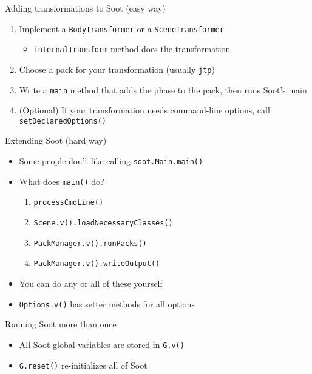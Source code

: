 \begin{slide}{Adding transformations to Soot (easy way)}
\vspace*{-0.1in}
\begin{enumerate}
\item Implement a \texttt{BodyTransformer} or a \texttt{SceneTransformer}
\begin{itemize}
\item \texttt{internalTransform} method does the transformation
\end{itemize}
\item Choose a pack for your transformation (usually \texttt{jtp})
\item Write a \texttt{main} method that adds the phase to the pack, then
runs Soot's main
\item (Optional) If your transformation needs command-line options,
call \texttt{setDeclaredOptions()}
\end{enumerate}
\end{slide}

\begin{slide}{Extending Soot (hard way)}
\begin{itemize}
\item Some people don't like calling \texttt{soot.Main.main()}
\item What does \texttt{main()} do?
\begin{enumerate}
\item \texttt{processCmdLine()}
\item \texttt{Scene.v().loadNecessaryClasses()}
\item \texttt{PackManager.v().runPacks()}
\item \texttt{PackManager.v().writeOutput()}
\end{enumerate}
\item You can do any or all of these yourself
\item \texttt{Options.v()} has setter methods for all options
\end{itemize}
\end{slide}

\begin{slide}{Running Soot more than once}
\begin{itemize}
\item All Soot global variables are stored in \texttt{G.v()}
\item \texttt{G.reset()} re-initializes all of Soot
\end{itemize}
\end{slide}

